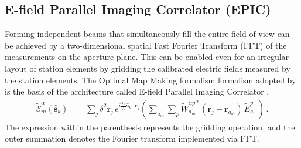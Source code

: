 \documentclass[
  journal=pasa,
  manuscript=article-type,
  year=2020,
  volume=37,
]{cup-journal}
\begin{document}
\subsection{E-field Parallel Imaging Correlator (EPIC)}

Forming independent beams that simultaneously fill the entire field of view can be achieved by a two-dimensional spatial Fast Fourier Transform (FFT) of the measurements on the aperture plane. This can be enabled even for an irregular layout of station elements by gridding the calibrated electric fields measured by the station elements. The Optimal Map Making formalism \citep[OMM;][]{Tegmark1997a} formalism adopted by \citet{Morales2011} is the basis of the architecture called E-field Parallel Imaging Correlator \cite[EPIC;][]{Thyagarajan+2017},
\begin{align}
    \widetilde{\mathcal{E}}_m^\alpha(\hat{\boldsymbol{s}}_k) &= \sum_j \delta^2 \boldsymbol{r}_j \, e^{i\frac{2\pi}{\lambda} \hat{\boldsymbol{s}}_k\cdot\boldsymbol{r}_j} \left(\sum_{a_m} \sum_p \widetilde{W}_{a_m}^{\alpha p*}(\boldsymbol{r}_j-\boldsymbol{r}_{a_m}) \, \widetilde{E}_{a_m}^p \right) \, . \label{eqn:intra-station-pol-hol-img-epic}
\end{align}
The expression within the parenthesis represents the gridding operation, and the outer summation denotes the Fourier transform implemented via FFT. 

\end{document}

